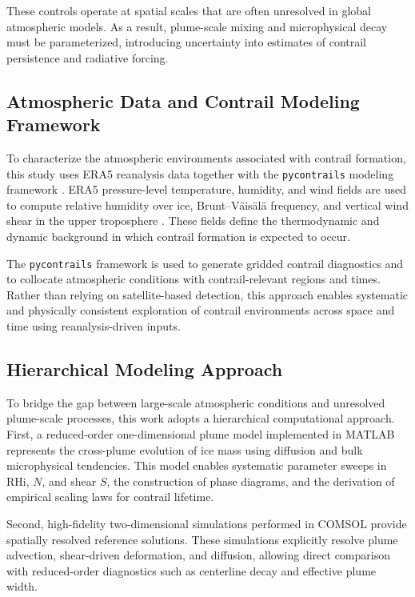 \documentclass[11pt]{article}
\begin{document}
These controls operate at spatial scales that are often unresolved in global atmospheric
models. As a result, plume-scale mixing and microphysical decay must be parameterized,
introducing uncertainty into estimates of contrail persistence and radiative forcing.

\subsection{Atmospheric Data and Contrail Modeling Framework}

To characterize the atmospheric environments associated with contrail formation, this
study uses ERA5 reanalysis data \cite{Hersbach2020} together with the \texttt{pycontrails}
modeling framework \cite{pycontrails}. 
ERA5 pressure-level temperature, humidity, and wind fields are used to compute relative
humidity over ice, Brunt--V\"ais\"al\"a frequency, and vertical wind shear in the upper troposphere
\cite{Hersbach2020,Holton2013}.
 These fields define the thermodynamic and dynamic background in which
contrail formation is expected to occur.

The \texttt{pycontrails} framework is used to generate gridded contrail diagnostics and
to collocate atmospheric conditions with contrail-relevant regions and times. Rather
than relying on satellite-based detection, this approach enables systematic and
physically consistent exploration of contrail environments across space and time using
reanalysis-driven inputs.

\subsection{Hierarchical Modeling Approach}

To bridge the gap between large-scale atmospheric conditions and unresolved plume-scale
processes, this work adopts a hierarchical computational approach. First, a reduced-order
one-dimensional plume model implemented in MATLAB represents the cross-plume evolution
of ice mass using diffusion and bulk microphysical tendencies. This model enables
systematic parameter sweeps in RHi, $N$, and shear $S$, the construction of phase diagrams,
and the derivation of empirical scaling laws for contrail lifetime.

Second, high-fidelity two-dimensional simulations performed in COMSOL provide spatially
resolved reference solutions. These simulations explicitly resolve plume advection,
shear-driven deformation, and diffusion, allowing direct comparison with reduced-order
diagnostics such as centerline decay and effective plume width.
\end{document}
